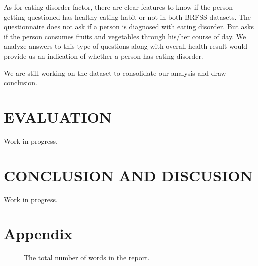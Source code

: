 \documentclass[letterpaper, 10 pt, conference]{ieeeconf}  %
\begin{document}
As for eating disorder factor, there are clear features to know if the person getting questioned has 
healthy eating habit or not in both BRFSS datasets. 
The questionnaire  does not ask if a person is diagnosed with eating disorder. But asks if the person consumes 
fruits and vegetables through his/her course of day. We analyze answers to this type of questions along with overall health
result would provide us an indication of whether a person has eating disorder.

We are still working on the dataset to consolidate our analysis and draw conclusion. 

\section{EVALUATION}
Work in progress.

\section{CONCLUSION AND DISCUSION}
Work in progress.

%
\captionsetup[figure]{labelformat=empty}
\clearpage 
\begin{figure}[hbt!]
        \centering
        
        \addvspace{250pt}
        
        \hspace{-10cm}
        
        \caption{}
        \label{fig:schedule}
\end{figure}

\clearpage 




\section{Appendix}
\begin{figure}[!htb]
        \caption{\label{fig:my-label} The total number of words in the report.}
\end{figure}
\end{document}
